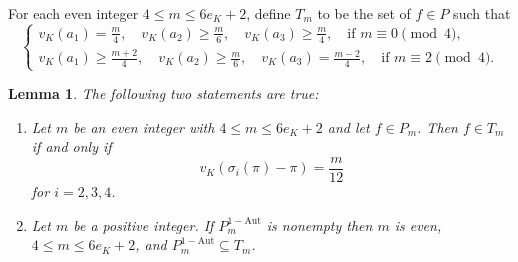 \documentclass[11pt]{amsart}
\theoremstyle{theorem}
\newtheorem{lemma}[theorem]{Lemma}
\theoremstyle{example}
\theoremstyle{definition}
\numberwithin{theorem}{section}
\numberwithin{theorem}{section}
\newcommand{\oneaut}{\mathrm{1-Aut}}
\begin{document}
For each even integer $4 \leq m \leq 6e_K + 2$, define $T_m$ to be the set of $f \in P$ such that 
$$
\begin{cases}
    v_K(a_1)= \frac{m}{4}, \quad v_K(a_2)\geq \frac{m}{6},\quad v_K(a_3) \geq \frac{m}{4}, \quad \text{if $m\equiv 0 \pmod{4}$},
    \\
    v_K(a_1) \geq \frac{m+2}{4},\quad v_K(a_2)\geq \frac{m}{6},\quad v_K(a_3) = \frac{m-2}{4},\quad \text{if $m \equiv 2\pmod{4}$}. 
\end{cases}
$$
\begin{lemma}
    \label{lem-T-m-iff-val-m-by-12}
     The following two statements are true:
    \begin{enumerate} 
    \item  Let $m$ be an even integer with $4 \leq m \leq 6e_K + 2$ and let $f \in P_m$. Then $f \in T_m$ if and only if 
    $$
    v_K(\sigma_i(\pi) - \pi) = \frac{m}{12}
    $$
    for $i=2,3,4$.
    \item Let $m$ be a positive integer. If $P_m^{\oneaut}$ is nonempty then $m$ is even, $4 \leq m \leq 6e_K + 2$, and $P_m^{\oneaut}\subseteq T_m$. 
    \end{enumerate}
\end{lemma}
\end{document}
